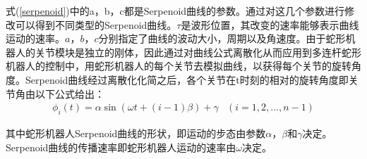 式(\ref{serpenoid})中的a，b，c都是Serpenoid曲线的参数。通过对这几个参数进行修改可以得到不同类型的Serpenoid曲线。$\tau$是波形位置，其改变的速率能够表示曲线运动的速率。$a$，$b$，$c$分别指定了曲线的波动大小，周期以及角速度。由于蛇形机器人的关节模块是独立的刚体，因此通过对曲线公式离散化从而应用到多连杆蛇形机器人的控制中，用蛇形机器人的每个关节去模拟曲线，以获得每个关节的旋转角度。Serpenoid曲线经过离散化化简之后，各个关节在t时刻的相对的旋转角度即关节角由以下公式给出：
\begin{eqnarray}\label{angledegree}
\phi _{i}(t)=\alpha \sin(\omega t+(i-1)\beta )+\gamma &(i=1,2,...,n-1)
\end{eqnarray}

其中蛇形机器人Serpenoid曲线的形状，即运动的步态由参数$\alpha$，$\beta$和$\gamma$决定。Serpenoid曲线的传播速率即蛇形机器人运动的速率由$\omega$决定。


